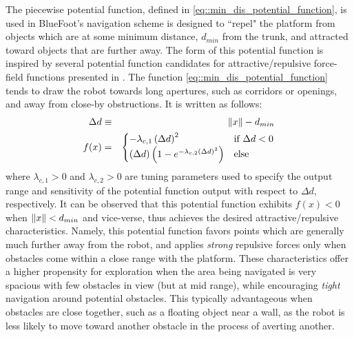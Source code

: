 			The piecewise potential function, defined in \ref{eq::min_dis_potential_function}, is used in BlueFoot's navigation scheme is designed to ``repel" the platform from objects which are at some minimum distance, $d_{min}$ from the trunk, and attracted toward objects that are further away. The form of this potential function is inspired by several potential function candidates for attractive/repulsive force-field functions presented in \cite{ArambulaCosio2004}. The function \ref{eq::min_dis_potential_function} tends to draw the robot towards long apertures, such as corridors or openings, and away from close-by obstructions. It is written as follows:
				\begin{eqnarray}
					\Delta d &\equiv& \left\lVert x\right\rVert-d_{min} \nonumber \\
					f(x) &=& 
					\begin{cases}	
					 	 -\lambda_{c,1} \left(\Delta d\right)^{2} &  \text{if } \Delta d < 0 \\
						\left(\Delta d\right) \left( 1  - e^{ -  \lambda_{c,2} { \left(\Delta d\right) }^{2} } \right) 	&  \text{else}
					\end{cases}
				\label{eq::min_dis_potential_function}
				\end{eqnarray}
			where $\lambda_{c,1}>0$ and $\lambda_{c,2}>0$ are tuning parameters used to specify the output range and sensitivity of the potential function output with respect to $\Delta d$, respectively. It can be observed that this potential function exhibits $f(x)<0$ when $\left\lVert x\right\rVert < d_{min}$ and vice-verse, thus achieves the desired attractive/repulsive characteristics. Namely, this potential function favors points which are generally much further away from the robot, and applies \emph{strong} repulsive forces only when obstacles come within a close range with the platform. These characteristics offer a higher propensity for exploration when the area being navigated is very spacious with few obstacles in view (but at mid range), while encouraging \emph{tight} navigation around potential obstacles. This typically advantageous when obstacles are close together, such as a floating object near a wall, as the robot is less likely to move toward another obstacle in the process of averting another.  

